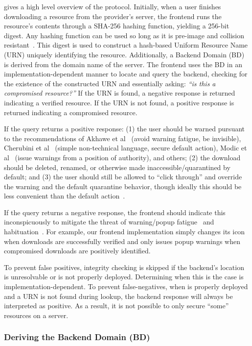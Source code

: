  gives a high level overview of the \SYSTEM{} protocol.
Initially, when a user finishes downloading a resource from the provider's
server, the frontend runs the resource's contents through a SHA-256 hashing
function, yielding a 256-bit digest. Any hashing function can be used so long as
it is pre-image and collision resistant~\cite{Rogaway}. This digest is used to
construct a hash-based Uniform Resource Name (URN) uniquely identifying the
resource. Additionally, a Backend Domain (BD) is derived from the domain name of
the server. The frontend uses the BD in an implementation-dependent manner to
locate and query the backend, checking for the existence of the constructed URN
and essentially asking: \emph{``is this a compromised resource?''} If the URN is
found, a negative response is returned indicating a verified resource. If the
URN is not found, a positive response is returned indicating a compromised
resource.

If the query returns a positive response: (1) the user should be warned pursuant
to the recommendations of Akhawe et al~\cite{Akhawe} (avoid warning fatigue, be
invisible), Cherubini et al~\cite{Cherubini} (simple non-technical language,
secure default action), Modic et al~\cite{Modic} (issue warnings from a position
of authority), and others; (2) the download should be deleted, renamed, or
otherwise made inaccessible/quarantined by default; and (3) the user should
still be allowed to ``click through'' and override the warning and the default
quarantine behavior, though ideally this should be less convenient than the
default action~\cite{Cherubini}.

If the query returns a negative response, the frontend should indicate this
inconspicuously to mitigate the threat of warning/popup
fatigue~\cite{Akhawe, Cherubini} and habituation~\cite{Sunshine}. For example,
our frontend implementation simply changes its icon when downloads are
successfully verified and only issues popup warnings when compromised downloads
are positively identified.

To prevent false positives, integrity checking is skipped if the backend's
location is unresolvable or \SYSTEM{} is not properly deployed. Determining when
this is the case is implementation-dependent. To prevent false-negatives, when
\SYSTEM{} is properly deployed and a URN is not found during lookup, the backend
response will always be interpreted as positive. As a result, it is not possible
to only secure ``some'' resources on a server.

\subsubsection{Deriving the Backend Domain (BD)}

